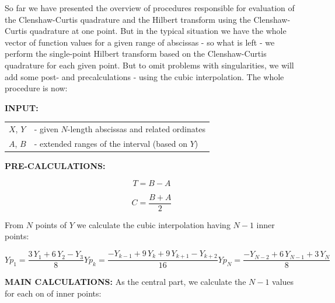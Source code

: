 \documentclass[12pt,twoside,a4paper]{article}
\def\emptyline{\vspace{12pt}}
\numberwithin{equation}{subsection}
\numberwithin{figure}{subsection}
\begin{document}
So far we have presented the overview of procedures responsible for evaluation of the Clenshaw-Curtis quadrature and the Hilbert
transform using the Clenshaw-Curtis quadrature at one point. But in the typical situation we have the whole vector of function
values for a given range of abscissas - so what is left - we perform the single-point Hilbert transform based on the
Clenshaw-Curtis quadrature for each given point. But to omit problems with singularities, we will add some post- and
precalculations - using the cubic interpolation. The whole procedure is now:


\textbf{INPUT:}
 

\begin{tabular}{ l l }

  $X$, $Y$ &- given $N$-length abscissas and related ordinates \\
  $A$, $B$ &- extended ranges of the interval (based on $Y$) \\
  
\end{tabular}


\emptyline


\textbf{PRE-CALCULATIONS:}

\begin{equation} \label{eq:cci_period}
  T = B - A
\end{equation}

\begin{equation} \label{eq:cci_center}
  C = \frac{B+A}{2}
\end{equation}

From $N$ points of $Y$ we calculate the cubic interpolation having $N-1$ inner points:

\begin{subequations} \label{eq:cci_cubicinterpolation}
  \begin{equation}   \label{eq:ccicinterp_first}
    {Yp_{1}}=\frac {3\,{Y_{1}} + 6\,{Y_{2}} - {Y_{3}}}{8}
  \end{equation}
  \begin{equation}   \label{eq:ccicinterp_next}
    {Yp_{k}}=\frac { - {Y_{k - 1}} + 9\,{Y_{k}} + 9\,{Y_{k + 1}} - {Y_{k + 2}}}{16}
  \end{equation}
  \begin{equation}   \label{eq:ccicinterp_last}
    {Yp_{N}}=\frac { - {Y_{N - 2}} + 6\,{Y_{N - 1}} + 3\,{Y_{N}}}{8}
  \end{equation}
\end{subequations}

\textbf{MAIN CALCULATIONS:}
As the central part, we calculate the $N-1$ values for each on of inner points: 
\end{document}

